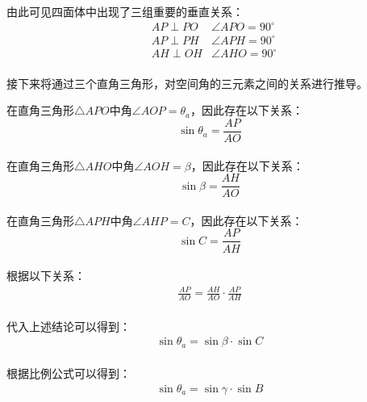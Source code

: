 \documentclass[UTF8]{ctexart}
\begin{document}
    由此可见四面体中出现了三组重要的垂直关系：\vspace{5pt}
    \setcounter{equation}{0}
    \begin{align}
        &AP\perp PO&\angle APO=90^\circ\\[3mm]
        &AP\perp PH&\angle APH=90^\circ\\[3mm]
        &AH\perp OH&\angle AHO=90^\circ
    \end{align}\\
    接下来将通过三个直角三角形，对空间角的三元素之间的关系进行推导。

\newpage

    在直角三角形$\triangle APO$中角$\angle AOP=\theta_a$，因此存在以下关系：\vspace{5pt}
    \begin{equation}
        \sin{\theta_a}=\frac{AP}{AO}
    \end{equation}\\
    在直角三角形$\triangle AHO$中角$\angle AOH=\beta$，因此存在以下关系：\vspace{5pt}
    \begin{equation}
        \sin{\beta}=\frac{AH}{AO}
    \end{equation}\\
    在直角三角形$\triangle APH$中角$\angle AHP=C$，因此存在以下关系：\vspace{5pt}
    \begin{equation}
        \sin{C}=\frac{AP}{AH}
    \end{equation}\\
    根据以下关系：
    \begin{align}
        \frac{AP}{AO}=\frac{AH}{AO}\cdot\frac{AP}{AH}
    \end{align}\\
    代入上述结论可以得到：
    \begin{align}
        \sin{\theta_a}=\sin{\beta}\cdot\sin{C}
    \end{align}\\
    根据比例公式可以得到：
    \begin{align}
        \sin{\theta_a}=\sin{\gamma}\cdot\sin{B}
    \end{align}

\newpage
\end{document}
